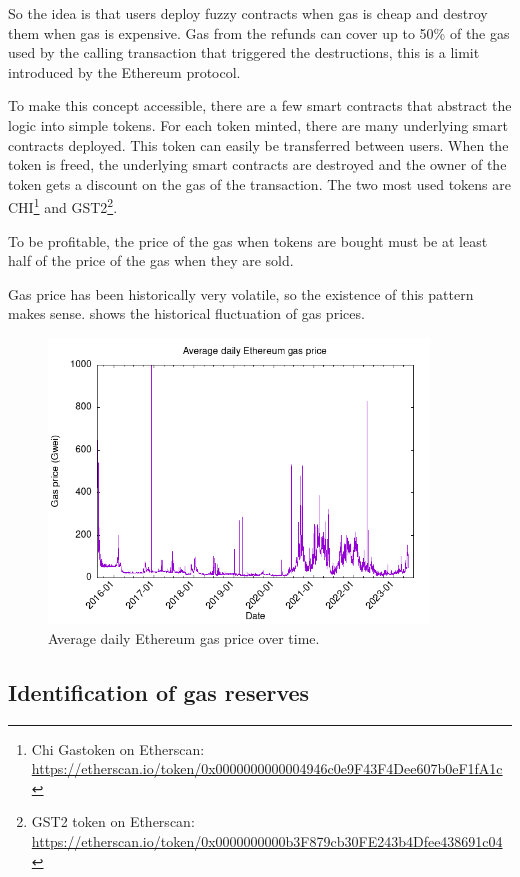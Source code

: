 So the idea is that users deploy fuzzy contracts when gas is cheap and destroy them when gas is expensive. Gas from the refunds can cover up to 50\% of the gas used by the calling transaction that triggered the destructions, this is a limit introduced by the Ethereum protocol. 

To make this concept accessible, there are a few smart contracts that abstract the logic into simple tokens. For each token minted, there are many underlying smart contracts deployed. This token can easily be transferred between users. When the token is freed, the underlying smart contracts are destroyed and the owner of the token gets a discount on the gas of the transaction. The two most used tokens are CHI\footnote{Chi Gastoken on Etherscan: \url{https://etherscan.io/token/0x0000000000004946c0e9F43F4Dee607b0eF1fA1c}} and GST2\footnote{GST2 token on Etherscan: \url{https://etherscan.io/token/0x0000000000b3F879cb30FE243b4Dfee438691c04}}.

To be profitable, the price of the gas when tokens are bought must be at least half of the price of the gas when they are sold. 

Gas price has been historically very volatile, so the existence of this pattern makes sense.
 shows the historical fluctuation of gas prices.

\begin{figure}[!ht]
    \centering
    \includegraphics[width=0.9\textwidth]{Figures/analysis/gas-price.png}
    \caption{Average daily Ethereum gas price over time.}
    \label{fig:gas-price}
\end{figure}

\subsection{Identification of gas reserves}

